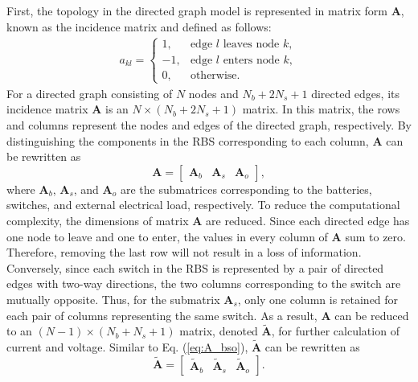 \documentclass{article}
\begin{document}
First, the topology in the directed graph model is represented in matrix form $\bm{A}$, known as the incidence matrix and defined as follows:
\begin{align}\label{eq:A}
    a_{kl}=
    \begin{cases}
        1,  & \text{edge $l$ leaves node $k$},\\
        -1, & \text{edge $l$ enters node $k$},\\
        0,  & \text{otherwise}.
    \end{cases}
\end{align}
For a directed graph consisting of $N$ nodes and $N_b+2N_s+1$ directed edges, its incidence matrix $\bm{A}$ is an $N\times(N_b+2N_s+1)$ matrix. 
In this matrix, the rows and columns represent the nodes and edges of the directed graph, respectively.
By distinguishing the components in the RBS corresponding to each column, $\bm{A}$ can be rewritten as
\begin{equation}\label{eq:A_bso}
    \bm{A} =
    \begin{bmatrix}
        \bm{A}_b & \bm{A}_s & \bm{A}_o
    \end{bmatrix},
\end{equation}
where $\bm{A}_b$, $\bm{A}_s$, and $\bm{A}_o$ are the submatrices corresponding to the batteries, switches, and external electrical load, respectively.
To reduce the computational complexity, the dimensions of matrix $\bm{A}$ are reduced.
Since each directed edge has one node to leave and one to enter, the values in every column of $\bm{A}$ sum to zero.
Therefore, removing the last row will not result in a loss of information. 
Conversely, since each switch in the RBS is represented by a pair of directed edges with two-way directions, the two columns corresponding to the switch are mutually opposite.
Thus, for the submatrix $\bm{A}_s$, only one column is retained for each pair of columns representing the same switch.
As a result, $\bm{A}$ can be reduced to an $(N-1)\times(N_b+N_s+1)$ matrix, denoted  $\bm{\tilde{A}}$, for further calculation of current and voltage.
Similar to Eq. (\ref{eq:A_bso}), $\bm{\tilde{A}}$ can be rewritten as
\begin{equation}\label{eq:A_bso_tilde}
    \bm{\tilde{A}} =
    \begin{bmatrix}
        \bm{\tilde{A}}_b & \bm{\tilde{A}}_s & \bm{\tilde{A}}_o
    \end{bmatrix}.
\end{equation}
\end{document}
